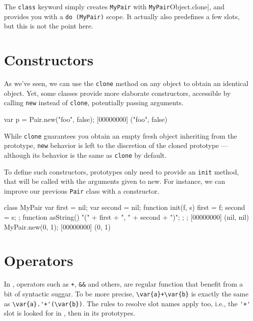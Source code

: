 The \lstinline{class} keyword simply creates \lstinline|MyPair| with
\lstinline|MyPair|Object.clone|, and provides you with a
\lstinline|do (MyPair)| scope. It actually also predefines a few
slots, but this is not the point here.

\section{Constructors}
\label{sec:tut:ctor}
As we've seen, we can use the \lstinline|clone| method on any object
to obtain an identical object. Yet, some classes provide more
elaborate constructors, accessible by calling \lstinline{new} instead
of \lstinline{clone}, potentially passing arguments.

\begin{urbiscript}[firstnumber=1]
var p = Pair.new("foo", false);
[00000000] ("foo", false)
\end{urbiscript}

While \lstinline{clone} guarantees you obtain an empty fresh object
inheriting from the prototype, \lstinline{new} behavior is left to the
discretion of the cloned prototype --- although its behavior is the
same as \lstinline{clone} by default.

To define such constructors, prototypes only need to provide an
\lstinline{init} method, that will be called with the arguments given to
new. For instance, we can improve our previous \lstinline{Pair} class
with a constructor.

\begin{urbiscript}[firstnumber=1]
class MyPair
{
  var first = nil;
  var second = nil;
  function init(f, s) { first = f;   second = s;  };
  function asString() { "(" + first + ", " + second + ")"; };
};
[00000000] (nil, nil)
MyPair.new(0, 1);
[00000000] (0, 1)
\end{urbiscript}

\section{Operators}
\label{sec:tut:operators}

In \us, operators such as \lstinline|+|, \lstinline|&&| and others,
are regular function that benefit from a bit of syntactic suggar.  To
be more precise, \lstinline|\var{a}+\var{b}| is exactly the same as
\lstinline|\var{a}.'+'(\var{b})|.  The rules to resolve slot names
apply too, i.e., the \lstinline|'+'| slot is looked for in ,
then in its prototypes.

